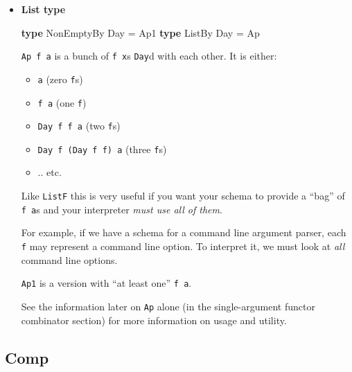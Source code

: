 \documentclass[]{article}
\newenvironment{Shaded}{}{}
\newcommand{\DataTypeTok}[1]{\textcolor[rgb]{0.56,0.13,0.00}{#1}}
\newcommand{\KeywordTok}[1]{\textcolor[rgb]{0.00,0.44,0.13}{\textbf{#1}}}
\newcommand{\OtherTok}[1]{\textcolor[rgb]{0.00,0.44,0.13}{#1}}
\renewcommand{\href}[2]{#2\footnote{\url{#1}}}
\begin{document}
\begin{itemize}
  \texttt{Apply}, from
  \emph{\href{https://hackage.haskell.org/package/semigroupoids/docs/Data-Functor-Apply.html}{Data.Functor.Apply}}
  in \emph{semigroupoids}, is ``\texttt{Applicative} without \texttt{pure}''; it
  only has \texttt{\textless{}*\textgreater{}} (called
  \texttt{\textless{}.\textgreater{}}).

  \texttt{pureT} is essentially
  \texttt{pure\ ::\ Applicative\ h\ =\textgreater{}\ a\ -\textgreater{}\ h\ a}.
\item
  \textbf{List type}

\begin{Shaded}
\begin{Highlighting}[]
\KeywordTok{type} \DataTypeTok{NonEmptyBy} \DataTypeTok{Day} \OtherTok{=} \DataTypeTok{Ap1}
\KeywordTok{type} \DataTypeTok{ListBy}     \DataTypeTok{Day} \OtherTok{=} \DataTypeTok{Ap}
\end{Highlighting}
\end{Shaded}

  \texttt{Ap\ f\ a} is a bunch of \texttt{f\ x}s \texttt{Day}d with each other.
  It is either:

  \begin{itemize}
  \tightlist
  \item
    \texttt{a} (zero \texttt{f}s)
  \item
    \texttt{f\ a} (one \texttt{f})
  \item
    \texttt{Day\ f\ f\ a} (two \texttt{f}s)
  \item
    \texttt{Day\ f\ (Day\ f\ f)\ a} (three \texttt{f}s)
  \item
    .. etc.
  \end{itemize}

  Like \texttt{ListF} this is very useful if you want your schema to provide a
  ``bag'' of \texttt{f\ a}s and your interpreter \emph{must use all of them}.

  For example, if we have a schema for a command line argument parser, each
  \texttt{f} may represent a command line option. To interpret it, we must look
  at \emph{all} command line options.

  \texttt{Ap1} is a version with ``at least one'' \texttt{f\ a}.

  See the information later on \texttt{Ap} alone (in the single-argument functor
  combinator section) for more information on usage and utility.
\end{itemize}

\subsection{Comp}\label{comp}
\end{document}
